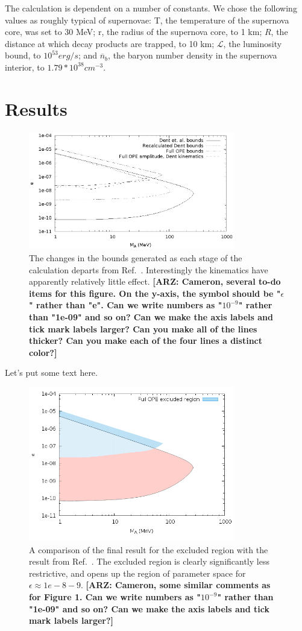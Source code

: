 \documentclass[nofootinbib,prd,superscriptaddress,twocolumn]{revtex4}
\newcommand{\n}{\overline{n}}
\newcommand{\arz}[1]{{{\bf{\color{BrickRed}[ARZ: #1]}}}}
\begin{document}
The calculation is dependent on a number of constants. We chose the following values as roughly typical of supernovae: T, the temperature of the supernova core, was set to 30 MeV; r, the radius of the supernova core, to 1 km; $ R $, the distance at which decay products are trapped, to 10 km; $ \mathcal{L} $, the luminosity bound, to $ 10^{53} erg/s $; and $ \n_b $, the baryon number density in the supernova interior, to $ 1.79*10^{38} cm^{-3} $. 


\section{Results}
\label{section:results}

\begin{figure}[th]
\includegraphics[width=9cm]{stages.eps}
\caption{The changes in the bounds generated as each stage of the calculation departs from Ref.~\cite{dent_etal12}. Interestingly the kinematics have apparently relatively little effect.
\arz{Cameron, several to-do items for this figure. On the y-axis, the symbol should be "$\epsilon$" rather than 
"e". Can we write numbers as "$10^{-9}$" rather than "1e-09" and so on? Can we make the axis labels and 
tick mark labels larger? Can you make all of the lines thicker? Can you make each of the four lines a distinct color?}
}
\end{figure}

Let's put some text here.

\begin{figure}[th]
	\includegraphics[width=9cm]{endtoend.png}
	\caption{A comparison of the final result for the excluded region with the result from Ref.~\cite{dent_etal12}. The excluded region is clearly significantly less restrictive, and opens up the region of parameter space for $\epsilon \approx  1e-8-9 $.
\arz{Cameron, some similar comments as for Figure 1. Can we write numbers as "$10^{-9}$" rather 
than "1e-09" and so on? Can we make the axis labels and tick mark labels larger?}	
	}
\end{figure}
\end{document}
